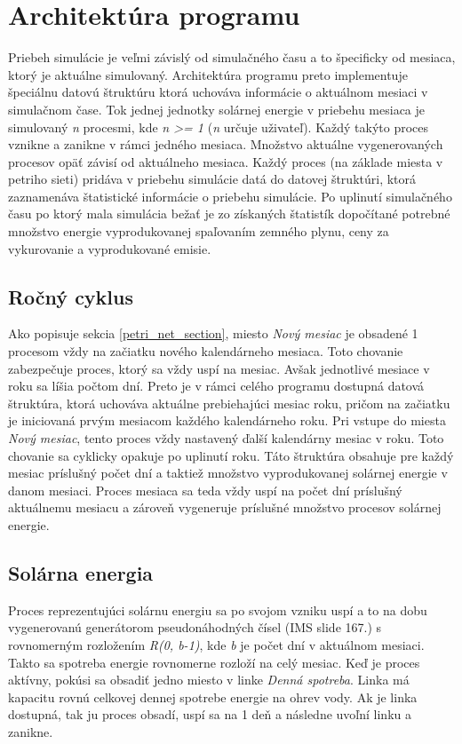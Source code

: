 \documentclass[a4paper, 11pt]{article}
\begin{document}
\section{Architektúra programu}
Priebeh simulácie je veľmi závislý od simulačného času a to špecificky od mesiaca, ktorý je aktuálne simulovaný. Architektúra programu preto implementuje špeciálnu datovú štruktúru ktorá uchováva informácie o aktuálnom mesiaci v simulačnom čase. Tok jednej jednotky solárnej energie v priebehu mesiaca je simulovaný \textit{n} procesmi, kde \textit{n >= 1} (\textit{n} určuje uživateľ). Každý takýto proces vznikne a zanikne v rámci jedného mesiaca. Množstvo aktuálne vygenerovaných procesov opäť závisí od aktuálneho mesiaca. Každý proces (na základe miesta v petriho sieti) pridáva v priebehu simulácie datá do datovej štruktúri, ktorá zaznamenáva štatistické informácie o priebehu simulácie. Po uplinutí simulačného času po ktorý mala simulácia bežať je zo získaných štatistík dopočítané potrebné množstvo energie vyprodukovanej spaľovaním zemného plynu, ceny za vykurovanie a vyprodukované emisie.

\subsection{Ročný cyklus}
Ako popisuje sekcia \ref{petri_net_section}, miesto \textit{Nový mesiac} je obsadené 1 procesom vždy na začiatku nového kalendárneho mesiaca. Toto chovanie zabezpečuje proces, ktorý sa vždy uspí na mesiac. Avšak jednotlivé mesiace v roku sa líšia počtom dní. Preto je v rámci celého programu dostupná datová štruktúra, ktorá uchováva aktuálne prebiehajúci mesiac roku, pričom na začiatku je iniciovaná prvým mesiacom každého kalendárneho roku. Pri vstupe do miesta \textit{Nový mesiac}, tento proces vždy nastavený ďalší kalendárny mesiac v roku. Toto chovanie sa cyklicky opakuje po uplinutí roku. Táto štruktúra obsahuje pre každý mesiac príslušný počet dní a taktiež množstvo vyprodukovanej solárnej energie v danom mesiaci. Proces mesiaca sa teda vždy uspí na počet dní príslušný aktuálnemu mesiacu a zároveň vygeneruje príslušné množstvo procesov solárnej energie.

\subsection{Solárna energia}\label{solar_energy_proces}
Proces reprezentujúci solárnu energiu sa po svojom vzniku uspí a to na dobu vygenerovanú generátorom pseudonáhodných čísel (IMS\cite{ims_slides} slide 167.) s rovnomerným rozložením \textit{R(0, b-1)}, kde \textit{b} je počet dní v aktuálnom mesiaci. Takto sa spotreba energie rovnomerne rozloží na celý mesiac. Keď je proces aktívny, pokúsi sa obsadiť jedno miesto v linke \textit{Denná spotreba}. Linka má kapacitu rovnú celkovej dennej spotrebe energie na ohrev vody. Ak je linka dostupná, tak ju proces obsadí, uspí sa na 1 deň a následne uvoľní linku a zanikne.
\end{document}
